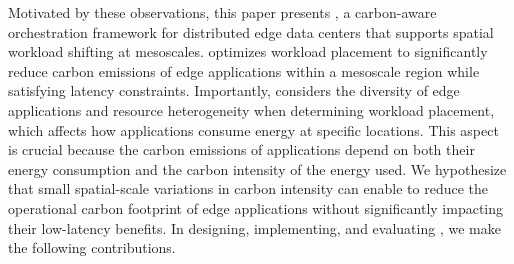 

Motivated by these observations, this paper presents \proposedsystem, a carbon-aware orchestration framework for distributed edge data centers that supports spatial workload shifting at mesoscales. \proposedsystem optimizes workload placement to significantly reduce carbon emissions of edge applications within a mesoscale region while satisfying latency constraints. 
Importantly, \proposedsystem considers the diversity of edge applications and resource heterogeneity when determining workload placement, which affects how applications consume energy at specific locations. This aspect is crucial because the carbon emissions of applications depend on both their energy consumption and the carbon intensity of the energy used. We hypothesize that 
small spatial-scale variations in carbon intensity can enable 
\proposedsystem to reduce the operational carbon footprint of edge applications without significantly impacting their low-latency benefits.
In designing, implementing, and evaluating \proposedsystem, we make the following contributions. 

